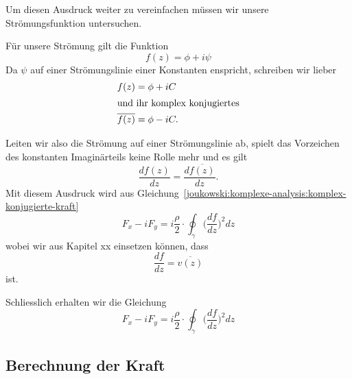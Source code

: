 Um diesen Ausdruck weiter zu vereinfachen müssen wir unsere Strömungsfunktion untersuchen.

Für unsere Strömung gilt die Funktion 
\[
	f(z)
	=
	\phi + i \psi
\]
Da $\psi$ auf einer Strömungslinie einer Konstanten enspricht,
schreiben wir lieber
\begin{align}
	&f(z)
	=
	\phi + i C
	\notag
	\\
	\intertext{und ihr komplex konjugiertes}
	&\overline{f(z)} 
	=
	\phi - i C.
	\notag
\end{align}

Leiten wir also die Strömung auf einer Strömungslinie ab,
spielt das Vorzeichen des konstanten Imaginärteils keine Rolle mehr und es gilt
\[
	\frac{df(z)}{dz}
	=
	\frac{d\overline{f(z)}}{dz}.
\]
Mit diesem Ausdruck wird aus Gleichung~\eqref{joukowski:komplexe-analysis:komplex-konjugierte-kraft}
\[
	F_x - i F_y
	=
	i \frac{\rho}{2} \cdot
	\displaystyle\oint_{\gamma}
	\biggl(\frac{df}{dz}\biggr)^2
	dz
\]
wobei wir aus Kapitel xx einsetzen können, dass
\[
	\frac{df}{dz}
	=
	\overline{v(z)}
\]
ist.

Schliesslich erhalten wir die Gleichung
\begin{equation}
	F_x - i F_y
	=
	i \frac{\rho}{2} \cdot
	\displaystyle\oint_{\gamma}
	\biggl(\frac{df}{dz}\biggr)^2
	dz
	\label{joukowski:komplexe-analysis:komplexe-kraft-mit-v-quadrat}
\end{equation}


\subsection{Berechnung der Kraft}





